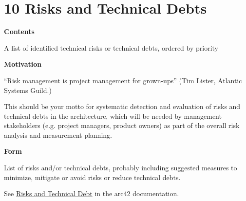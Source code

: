 \hypertarget{section-technical-risks}{%
\section{10 Risks and Technical Debts}\label{section-technical-risks}}

\textbf{Contents}

A list of identified technical risks or technical debts, ordered by
priority

\textbf{Motivation}

``Risk management is project management for grown-ups'' (Tim Lister,
Atlantic Systems Guild.)

This should be your motto for systematic detection and evaluation of
risks and technical debts in the architecture, which will be needed by
management stakeholders (e.g. project managers, product owners) as part
of the overall risk analysis and measurement planning.

\textbf{Form}

List of risks and/or technical debts, probably including suggested
measures to minimize, mitigate or avoid risks or reduce technical debts.

See \href{https://docs.arc42.org/section-11/}{Risks and Technical Debt}
in the arc42 documentation.
